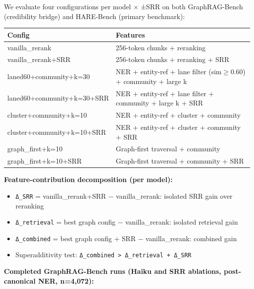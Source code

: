 \documentclass[
]{article}
\providecommand{\tightlist}{%
  \setlength{\itemsep}{0pt}\setlength{\parskip}{0pt}}
\begin{document}
We evaluate four configurations per model × ±SRR on both GraphRAG-Bench
(credibility bridge) and HARE-Bench (primary benchmark):

\begin{small}
\setlength{\tabcolsep}{4pt}
\begin{longtable}{p{2.5in}p{3.7in}}
\toprule
\textbf{Config} & \textbf{Features} \\
\midrule
\endhead
vanilla\_rerank & 256-token chunks + reranking \\
vanilla\_rerank+SRR & 256-token chunks + reranking + SRR \\
laned60+community+k=30 & NER + entity-ref + lane filter (sim$\geq$0.60) + community + large k \\
laned60+community+k=30+SRR & NER + entity-ref + lane filter + community + large k + SRR \\
cluster+community+k=10 & NER + entity-ref + cluster + community \\
cluster+community+k=10+SRR & NER + entity-ref + cluster + community + SRR \\
graph\_first+k=10 & Graph-first traversal + community \\
graph\_first+k=10+SRR & Graph-first traversal + community + SRR \\
\bottomrule
\end{longtable}
\end{small}

\textbf{Feature-contribution decomposition (per model):}

\begin{itemize}
\tightlist
\item
  \texttt{Δ\_SRR} = vanilla\_rerank+SRR − vanilla\_rerank: isolated SRR
  gain over reranking
\item
  \texttt{Δ\_retrieval} = best graph config − vanilla\_rerank: isolated
  retrieval gain
\item
  \texttt{Δ\_combined} = best graph config + SRR − vanilla\_rerank:
  combined gain
\item
  Superadditivity test:
  \texttt{Δ\_combined\ \textgreater{}\ Δ\_retrieval\ +\ Δ\_SRR}
\end{itemize}

\textbf{Completed GraphRAG-Bench runs (Haiku and SRR ablations,
post-canonical NER, n=4,072):}
\end{document}
